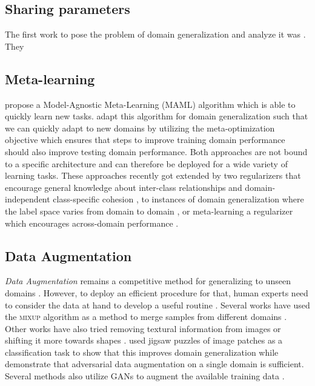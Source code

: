 \subsection{Sharing parameters}

The first work to pose the problem of domain generalization and analyze it was \citet{BlanchardLS11}. They  \citep{an2019generalization} \citep{blanchard2017domain}

\citep{KhoslaZMET12} \citep{GhifaryKZB15}

\subsection{Meta-learning}
\citet{LiYSH18} propose a Model-Agnostic Meta-Learning (MAML) algorithm which is able to quickly learn new tasks. \citet{FinnAL17} adapt this algorithm for domain generalization such that we can quickly adapt to new domains by utilizing the meta-optimization objective which ensures that steps to improve training domain performance should also improve testing domain performance. Both approaches are not bound to a specific architecture and can therefore be deployed for a wide variety of learning tasks. These approaches recently got extended by two regularizers that encourage general knowledge about inter-class relationships and domain-independent class-specific cohesion \citep{DouCKG19}, to instances of domain generalization where the label space varies from domain to domain \citep{LiYZH19}, or meta-learning a regularizer which encourages across-domain performance \citep{BalajiSC18}.

\subsection{Data Augmentation}
\emph{Data Augmentation} remains a competitive method for generalizing to unseen domains \citep{zhang2019unseen}. However, to deploy an efficient procedure for that, human experts need to consider the data at hand to develop a useful routine \citep{gulrajani2020search}. Several works have used the \textsc{mixup} \citep{ZhangCDL18} algorithm as a method to merge samples from different domains \citep{XuZNLWTZ20, yan2020improve, WangLK20, mancini2020}. Other works have also tried removing textural information from images \citep{WangHLX19} or shifting it more towards shapes \citep{nam2019reducing, asadi2019shape}. \citet{CarlucciDBCT19} used jigsaw puzzles of image patches as a classification task to show that this improves domain generalization while \citet{VolpiNSDMS18} demonstrate that adversarial data augmentation on a single domain is sufficient. Several methods also utilize GANs to augment the available training data  \citep{RahmanFBS19, ZhouYHX20}.

